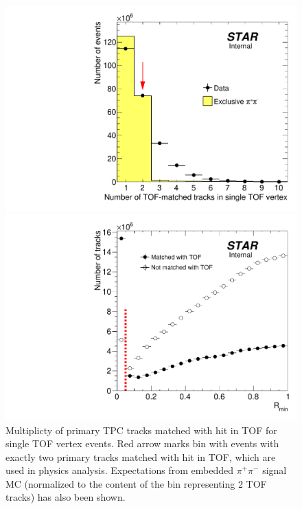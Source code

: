 \begin{figure}[t!]%
\centering%
\begin{minipage}{.4725\textwidth}%
  \centering%
  \includegraphics[width=\linewidth]{graphics/eventSelection/TpcTracks/NumberOfTofTracksInSingleTofVertex.pdf}%
  \caption[Multiplicty of primary TPC tracks matched with hit in TOF for single TOF vertex events]{Multiplicty of primary TPC tracks matched with hit in TOF for single TOF vertex events. Red arrow marks bin with events with exactly two primary tracks matched with hit in TOF, which are used in physics analysis. Expectations from embedded $\pi^{+}\pi^{-}$ signal MC (normalized to the content of the bin representing 2 TOF tracks) has also been shown.}\label{fig:NumberOfTofTracksInSingleTofVertex}
\end{minipage}%
\quad\quad%
\begin{minipage}{.4725\textwidth}%
  \centering
  \includegraphics[width=\linewidth]{graphics/eventSelection/TpcTracks/Rmin.pdf}%

\end{minipage}
\end{figure}
